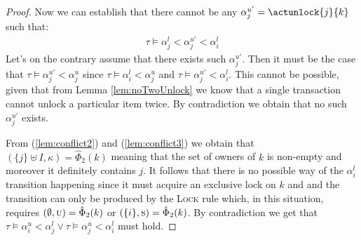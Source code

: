 \begin{proof}
Now we can establish that there cannot be any $\alpha_j^{u'} = \actunlock{j}{k}$ such that:
\begin{gather}
	\label{lem:conflict3}
	\tau \vDash \alpha_j^l < \alpha_j^{u'} < \alpha_i^l
\end{gather}
Let's on the contrary assume that there exists such $\alpha_j^{u'}$. Then it must be the case that $\tau \vDash \alpha_j^{u'} < \alpha_j^{u}$ since $\tau \vDash \alpha_i^l < \alpha_j^u$ and $\tau \vDash \alpha_j^{u'} < \alpha_i^l$. This cannot be possible, given that from Lemma \ref{lem:noTwoUnlock} we know that a single transaction cannot unlock a particular item twice. By contradiction we obtain that no such $\alpha_j^{u'}$ exists.

From (\ref{lem:conflict2}) and (\ref{lem:conflict3}) we obtain that $(\{j\} \uplus I, \kappa) = \hat{\Phi}_2(k)$ meaning that the set of owners of $k$ is non-empty and moreover it definitely contains $j$. It follows that there is no possible way of the $\alpha_i^l$ transition happening since it must acquire an exclusive lock on $k$ and and the transition can only be produced by the \textsc{Lock} rule which, in this situation, requires $(\emptyset, \textsc{u}) = \hat{\Phi}_2(k)$ or $(\{ i \}, \textsc{s}) = \hat{\Phi}_2(k)$. By contradiction we get that $\tau \vDash \alpha_i^u < \alpha_j^l  \lor \tau \vDash \alpha_j^u < \alpha_i^l$ must hold.
\end{proof}